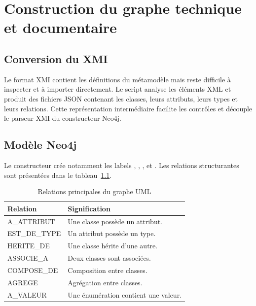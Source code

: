 \chapter{Construction du graphe technique et documentaire}

\section{Conversion du XMI}

Le format XMI contient les définitions du métamodèle mais reste difficile à inspecter et à importer directement. Le script  analyse les éléments XML et produit des fichiers JSON contenant les classes, leurs attributs, leurs types et leurs relations. Cette représentation intermédiaire facilite les contrôles et découple le parseur XMI du constructeur Neo4j.


\section{Modèle Neo4j}

Le constructeur crée notamment les labels , , ,  et . Les relations structurantes sont présentées dans le tableau~\ref{tab:relations-uml}.

\begin{table}[H]
\centering
\caption{Relations principales du graphe UML}
\label{tab:relations-uml}
\begin{tabularx}{\textwidth}{>{\ttfamily}p{}X}
\toprule
Relation & Signification \\
\midrule
A\_ATTRIBUT & Une classe possède un attribut. \\
EST\_DE\_TYPE & Un attribut possède un type. \\
HERITE\_DE & Une classe hérite d'une autre. \\
ASSOCIE\_A & Deux classes sont associées. \\
COMPOSE\_DE & Composition entre classes. \\
AGREGE & Agrégation entre classes. \\
A\_VALEUR & Une énumération contient une valeur. \\
\bottomrule
\end{tabularx}
\end{table}


